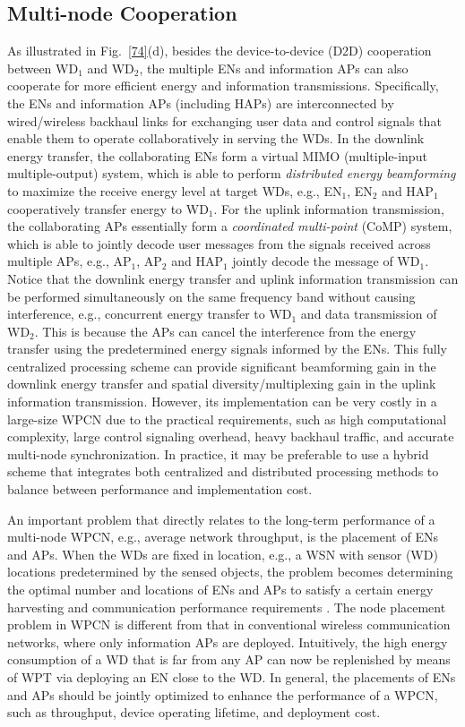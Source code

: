 \documentclass[journal, draftcls, one column, 12pt]{IEEEtran}
\begin{document}
\subsection{Multi-node Cooperation}
As illustrated in Fig.~\ref{74}(d), besides the device-to-device (D2D) cooperation between WD$_1$ and WD$_2$, the multiple ENs and information APs can also cooperate for more efficient energy and information transmissions. Specifically, the ENs and information APs (including HAPs) are interconnected by wired/wireless backhaul links for exchanging user data and control signals that enable them to operate collaboratively in serving the WDs. In the downlink energy transfer, the collaborating ENs form a virtual MIMO (multiple-input multiple-output) system, which is able to perform \emph{distributed energy beamforming} to maximize the receive energy level at target WDs, e.g., EN$_1$, EN$_2$ and HAP$_1$ cooperatively transfer energy to WD$_1$. For the uplink information transmission, the collaborating APs essentially form a \emph{coordinated multi-point} (CoMP) system, which is able to jointly decode user messages from the signals received across multiple APs, e.g., AP$_1$, AP$_2$ and HAP$_1$ jointly decode the message of WD$_1$. Notice that the downlink energy transfer and uplink information transmission can be performed simultaneously on the same frequency band without causing interference, e.g., concurrent energy transfer to WD$_1$ and data transmission of WD$_2$. This is because the APs can cancel the interference from the energy transfer using the predetermined energy signals informed by the ENs. This fully centralized processing scheme can provide significant beamforming gain in the downlink energy transfer and spatial diversity/multiplexing gain in the uplink information transmission. However, its implementation can be very costly in a large-size WPCN due to the practical requirements, such as high computational complexity, large control signaling overhead, heavy backhaul traffic, and accurate multi-node synchronization. In practice, it may be preferable to use a hybrid scheme that integrates both centralized and distributed processing methods to balance between performance and implementation cost.

An important problem that directly relates to the long-term performance of a multi-node WPCN, e.g., average network throughput, is the placement of ENs and APs. When the WDs are fixed in location, e.g., a WSN with sensor (WD) locations predetermined by the sensed objects, the problem becomes determining the optimal number and locations of ENs and APs to satisfy a certain energy harvesting and communication performance requirements \cite{2015:Bi1}. The node placement problem in WPCN is different from that in conventional wireless communication networks, where only information APs are deployed. Intuitively, the high energy consumption of a WD that is far from any AP can now be replenished by means of WPT via deploying an EN close to the WD. In general, the placements of ENs and APs should be jointly optimized to enhance the performance of a WPCN, such as throughput, device operating lifetime, and deployment cost.
\end{document}
